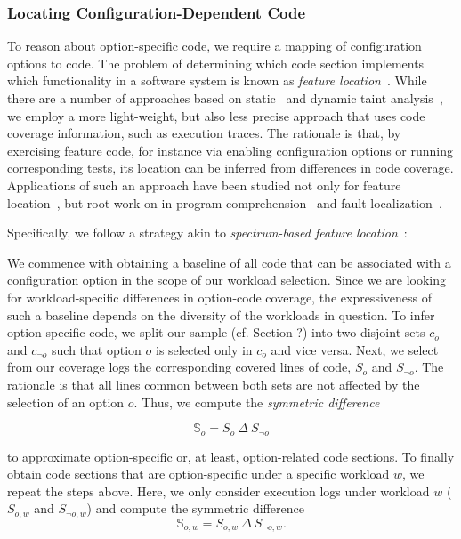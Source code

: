 {{{\subsubsection{Locating Configuration-Dependent Code}
To reason about option-specific code, we require a mapping of configuration options to code. 
The problem of determining which code section implements which functionality in a software system is known as \emph{feature location}~\cite{rubin_feature_2013}. 
While there are a number of approaches based on static~\cite{velez_2020_configcrusher_jase,lillack_2018_lotrack_tse,luo_2019_cova} and dynamic taint analysis~\cite{bell_phosphor_2014,velez_comprex_2021,splat_kim_2013}, we employ a more light-weight,  but also less precise approach that uses code coverage information, such as execution traces.
The rationale is that, by exercising feature code, for instance via enabling configuration options or running corresponding tests, its location can be inferred from differences in code coverage. 
Applications of such an approach have been studied not only for feature location~\cite{wong_integrated_2005,sulir_annotation_2015,michelon_spectrum_2021,perez_framing_2016}, but root work on in program comprehension~\cite{wilde_early_1996,wilde_reconnaissance_1995,sherwood_reducing_nodate,perez_diagnosis_2014,castro_pangolin_2019} and fault localization~\cite{agrawal_fault_1995,wong_faultloc_2016}. 
}
Specifically, we follow  a strategy akin to  \textit{spectrum-based feature location}~\cite{michelon_spectrum_2021}:

{\color{edited}
We commence with obtaining a baseline of all code that can be associated with a configuration option in the scope of our workload selection. Since we are looking for workload-specific differences in option-code coverage, the expressiveness of such a baseline depends on the diversity of the workloads in question. To infer option-specific code, we split our sample (cf. Section ?) into two disjoint sets $c_o$ and $c_{\neg o}$ such that option $o$ is selected only in $c_o$ and vice versa. Next, we select from our coverage logs the corresponding covered lines of code, $S_o$ and $S_{\neg o}$.  The rationale is that all lines common between both sets are not affected by the selection of an option $o$. Thus, we compute the \textit{symmetric difference} 

$$\mathbb{S}_o = S_o~\Delta~S_{\neg o}$$

 to approximate option-specific or, at least, option-related code sections. To finally obtain code sections that are option-specific under a specific workload $w$, we repeat the steps above. Here, we only consider execution logs under workload $w$ ($S_{o, w}$ and $S_{\neg o, w}$) and compute the symmetric difference $$\mathbb{S}_{o,w}=S_{o,w}~\Delta~S_{\neg o, w}.$$  


}}}
